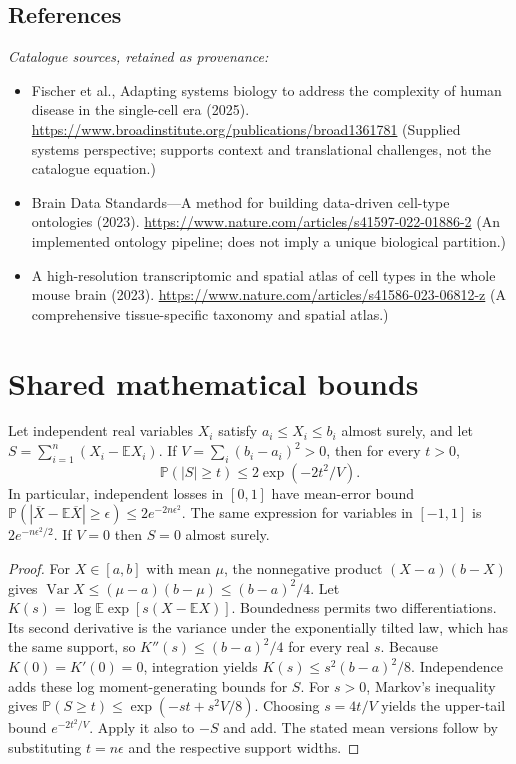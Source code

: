 \documentclass[11pt]{article}
\begin{document}
\subsection{References}
\noindent\emph{Catalogue sources, retained as provenance:}
\begin{itemize}
\item Fischer et al., Adapting systems biology to address the complexity of human disease in the single-cell era (2025). \url{https://www.broadinstitute.org/publications/broad1361781} (Supplied systems perspective; supports context and translational challenges, not the catalogue equation.)
\item Brain Data Standards---A method for building data-driven cell-type ontologies (2023). \url{https://www.nature.com/articles/s41597-022-01886-2} (An implemented ontology pipeline; does not imply a unique biological partition.)
\item A high-resolution transcriptomic and spatial atlas of cell types in the whole mouse brain (2023). \url{https://www.nature.com/articles/s41586-023-06812-z} (A comprehensive tissue-specific taxonomy and spatial atlas.)
\end{itemize}




\section{Shared mathematical bounds}\label{app:bounds}
\begin{lemma}\label{lem:bounded}
Let independent real variables $X_i$ satisfy $a_i\leq X_i\leq b_i$ almost surely,
and let $S=\sum_{i=1}^n(X_i-\mathbb{E} X_i)$. If
$V=\sum_i(b_i-a_i)^2>0$, then for every $t>0$,
\[
 \mathbb{P}(|S|\geq t)\leq 2\exp(-2t^2/V).
\]
In particular, independent losses in $[0,1]$ have mean-error bound
$\mathbb{P}(|\overline X-\mathbb{E}\overline X|\geq\epsilon)
\leq2e^{-2n\epsilon^2}$. The same expression for variables in $[-1,1]$
is $2e^{-n\epsilon^2/2}$. If $V=0$ then $S=0$ almost surely.
\end{lemma}
\begin{proof}
For $X\in[a,b]$ with mean $\mu$, the nonnegative product
$(X-a)(b-X)$ gives
$\operatorname{Var} X\leq(\mu-a)(b-\mu)\leq(b-a)^2/4$.
Let $K(s)=\log\mathbb{E}\exp[s(X-\mathbb{E} X)]$.
Boundedness permits two differentiations. Its second derivative is the variance
under the exponentially tilted law, which has the same support, so
$K''(s)\leq(b-a)^2/4$ for every real $s$.
Because $K(0)=K'(0)=0$, integration yields
$K(s)\leq s^2(b-a)^2/8$.
Independence adds these log moment-generating bounds for $S$.
For $s>0$, Markov's inequality gives
$\mathbb{P}(S\geq t)\leq\exp(-st+s^2V/8)$.
Choosing $s=4t/V$ yields the upper-tail bound $e^{-2t^2/V}$.
Apply it also to $-S$ and add. The stated mean versions follow by substituting
$t=n\epsilon$ and the respective support widths.
\end{proof}
\end{document}
